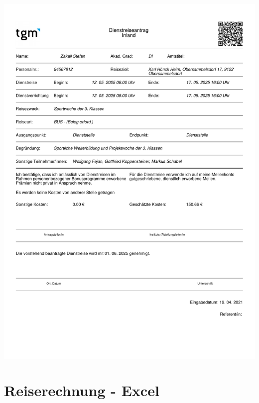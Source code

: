 \begin{center}
	\includegraphics[width=\linewidth]{chapters/appendix/business_trip_application_szakall}
\end{center}


\section*{Reiserechnung - Excel}
{}

%


